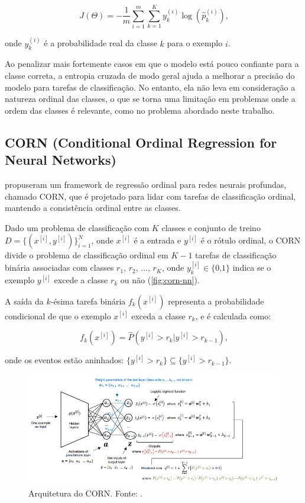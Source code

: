 \begin{equation}
    J(\Theta) = -\frac{1}{m} \sum_{i=1}^{m} \sum_{k=1}^{K} y_{k}^{(i)} \log(\hat{p}_k^{(i)}) \text{,}
\end{equation}

onde $y_{k}^{(i)}$ é a probabilidade real da classe $k$ para o exemplo $i$.

Ao penalizar mais fortemente casos em que o modelo está pouco confiante para a classe correta, a entropia cruzada de modo geral ajuda a melhorar a precisão do modelo para tarefas de classificação. No entanto, ela não leva em consideração a natureza ordinal das classes, o que se torna uma limitação em problemas onde a ordem das classes é relevante, como no problema abordado neste trabalho.

\subsection{CORN (Conditional Ordinal Regression for Neural Networks)}

\cite{Shi_2023} propuseram um framework de regressão ordinal para redes neurais profundas, chamado CORN, que é projetado para lidar com tarefas de classificação ordinal, mantendo a consistência ordinal entre as classes.

Dado um problema de classificação com $K$ classes e conjunto de treino $D = \{(x^{[i]}, y^{[i]})\}_{i=1}^{N}$, onde $x^{[i]}$ é a entrada e $y^{[i]}$ é o rótulo ordinal, o CORN divide o problema de classificação ordinal em $K-1$ tarefas de classificação binária associadas com classes $r_1$, $r_2$, $...$, $r_K$, onde $y_{k}^{[i]} \in \lbrace 0 \text{,} 1 \rbrace$ indica se o exemplo $y^{[i]}$ excede a classe $r_k$ ou não (\autoref{fig:corn-nn}).

A saída da $k$-ésima tarefa binária $f_k (x^{[i]})$ representa a probabilidade condicional de que o exemplo $x^{[i]}$ exceda a classe $r_k$, e é calculada como:

\begin{equation}
    f_k (x^{[i]}) = \hat{P} (y^{[i]} > r_k | y^{[i]} > r_{k-1}) \text{,}
\end{equation}

onde os eventos estão aninhados: $\lbrace y^{[i]} > r_k \rbrace \subseteq \lbrace y^{[i]} > r_{k-1} \rbrace$.

\begin{figure}[h]
    \centering
    \includegraphics[width=\linewidth]{figs/corn-nn.png}
    \caption{Arquitetura do CORN. Fonte: \cite{Shi_2023}.}
    \label{fig:corn-nn}
\end{figure}

